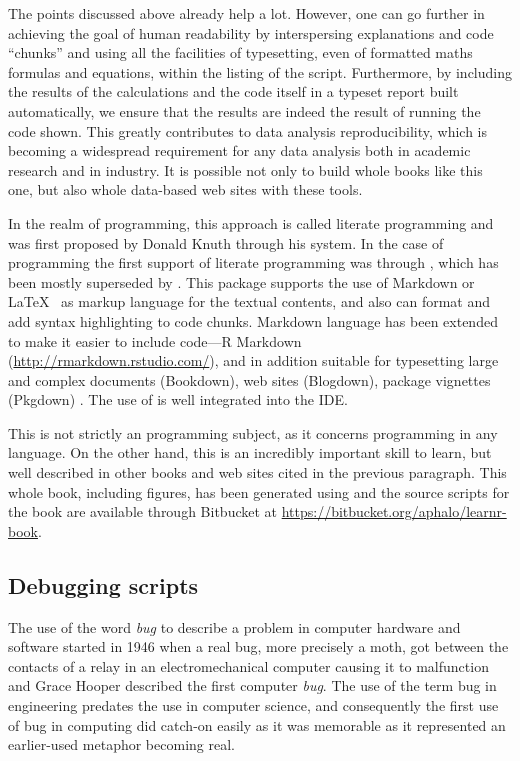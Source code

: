 \documentclass[krantz2]{krantz}\usepackage{knitr}%
\begin{document}
The points discussed above already help a lot. However, one can go further in achieving the goal of human readability by interspersing explanations and code ``chunks'' and using all the facilities of typesetting, even of formatted maths formulas and equations, within the listing of the script. Furthermore, by including the results of the calculations and the code itself in a typeset report built automatically, we ensure that the results are indeed the result of running the code shown. This greatly contributes to data analysis reproducibility, which is becoming a widespread requirement for any data analysis both in academic research and in industry. It is possible not only to build whole books like this one, but also whole data-based web sites with these tools.

In the realm of programming, this approach is called literate programming and was first proposed by Donald Knuth \autocite{Knuth1984a} through his  system. In the case of \Rpgrm programming the first support of literate programming was through , which has been mostly superseded by  \autocite{Xie2013}. This package supports the use of Markdown or \LaTeX\ \autocite{Lamport1994} as markup language for the textual contents, and also can format and add syntax highlighting to code chunks. Markdown language has been extended to make it easier to include \Rlang code---R Markdown (\url{http://rmarkdown.rstudio.com/}), and in addition suitable for typesetting large and complex documents (Bookdown), web sites (Blogdown), package vignettes (Pkgdown) \autocite{Xie2016,Xie2018}. The use of  is well integrated into the \RStudio IDE.

This is not strictly an \Rlang programming subject, as it concerns programming in any language. On the other hand, this is an incredibly important skill to learn, but well described in other books and web sites cited in the previous paragraph. This whole book, including figures, has been generated using  and the source scripts for the book are available through Bitbucket at \url{https://bitbucket.org/aphalo/learnr-book}.

\subsection{Debugging scripts}\label{sec:script:debug}

The use of the word \emph{bug} to describe a problem in computer hardware and software started in 1946 when a real bug, more precisely a moth, got between the contacts of a relay in an electromechanical computer causing it to malfunction and Grace Hooper described the first computer \emph{bug}. The use of the term bug in engineering predates the use in computer science, and consequently the first use of bug in computing did catch-on easily as it was memorable as it represented an earlier-used metaphor becoming real.
\end{document}
